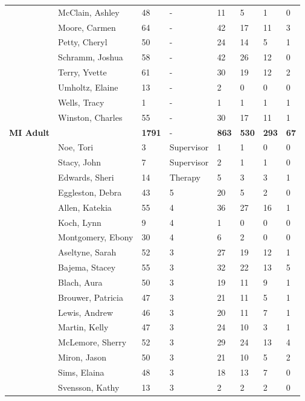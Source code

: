 \documentclass{article}\usepackage[]{graphicx}\usepackage[]{color}
\begin{document}
{\begin{longtable} { >{\raggedright}p{}p{}p{}p{}p{}p{}p{}p{}}
   & McClain, Ashley & 48 & - & 11 & 5 & 1 & 0 \\ 
   & Moore, Carmen & 64 & - & 42 & 17 & 11 & 3 \\ 
   \rowcolor[gray]{0.90} & Petty, Cheryl & 50 & - & 24 & 14 & 5 & 1 \\ 
   \rowcolor[gray]{0.90} & Schramm, Joshua & 58 & - & 42 & 26 & 12 & 0 \\ 
   \rowcolor[gray]{0.90} & Terry, Yvette & 61 & - & 30 & 19 & 12 & 2 \\ 
   & Umholtz, Elaine & 13 & - & 2 & 0 & 0 & 0 \\ 
   & Wells, Tracy & 1 & - & 1 & 1 & 1 & 1 \\ 
   & Winston, Charles & 55 & - & 30 & 17 & 11 & 1 \\ 
   \hline
\textbf{MI Adult} &  & \textbf{1791} & - & \textbf{863} & \textbf{530} & \textbf{293} & \textbf{67} \\ 
   \rowcolor[gray]{0.90} & Noe, Tori & 3 & Supervisor & 1 & 1 & 0 & 0 \\ 
   \rowcolor[gray]{0.90} & Stacy, John & 7 & Supervisor & 2 & 1 & 1 & 0 \\ 
   & Edwards, Sheri & 14 & Therapy & 5 & 3 & 3 & 1 \\ 
   & Eggleston, Debra & 43 & 5 & 20 & 5 & 2 & 0 \\ 
   & Allen, Katekia & 55 & 4 & 36 & 27 & 16 & 1 \\ 
   \rowcolor[gray]{0.90} & Koch, Lynn & 9 & 4 & 1 & 0 & 0 & 0 \\ 
   \rowcolor[gray]{0.90} & Montgomery, Ebony & 30 & 4 & 6 & 2 & 0 & 0 \\ 
   \rowcolor[gray]{0.90} & Aseltyne, Sarah & 52 & 3 & 27 & 19 & 12 & 1 \\ 
   & Bajema, Stacey & 55 & 3 & 32 & 22 & 13 & 5 \\ 
   & Blach, Aura & 50 & 3 & 19 & 11 & 9 & 1 \\ 
   & Brouwer, Patricia & 47 & 3 & 21 & 11 & 5 & 1 \\ 
   \rowcolor[gray]{0.90} & Lewis, Andrew & 46 & 3 & 20 & 11 & 7 & 1 \\ 
   \rowcolor[gray]{0.90} & Martin, Kelly & 47 & 3 & 24 & 10 & 3 & 1 \\ 
   \rowcolor[gray]{0.90} & McLemore, Sherry & 52 & 3 & 29 & 24 & 13 & 4 \\ 
   & Miron, Jason & 50 & 3 & 21 & 10 & 5 & 2 \\ 
   & Sims, Elaina & 48 & 3 & 18 & 13 & 7 & 0 \\ 
   & Svensson, Kathy & 13 & 3 & 2 & 2 & 2 & 0 \\ 

\end{longtable}}
\end{document}
